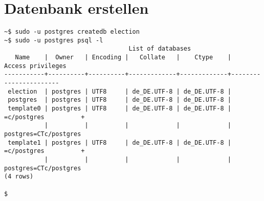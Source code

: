 \documentclass[a4paper]{article}
\begin{document}
\section{Datenbank erstellen}
\begin{verbatim}
~$ sudo -u postgres createdb election
~$ sudo -u postgres psql -l
                                  List of databases
   Name    |  Owner   | Encoding |   Collate   |    Ctype    |   Access privileges   
-----------+----------+----------+-------------+-------------+-----------------------
 election  | postgres | UTF8     | de_DE.UTF-8 | de_DE.UTF-8 | 
 postgres  | postgres | UTF8     | de_DE.UTF-8 | de_DE.UTF-8 | 
 template0 | postgres | UTF8     | de_DE.UTF-8 | de_DE.UTF-8 | =c/postgres          +
           |          |          |             |             | postgres=CTc/postgres
 template1 | postgres | UTF8     | de_DE.UTF-8 | de_DE.UTF-8 | =c/postgres          +
           |          |          |             |             | postgres=CTc/postgres
(4 rows)

$ 
\end{verbatim}

%
%
\end{document}
